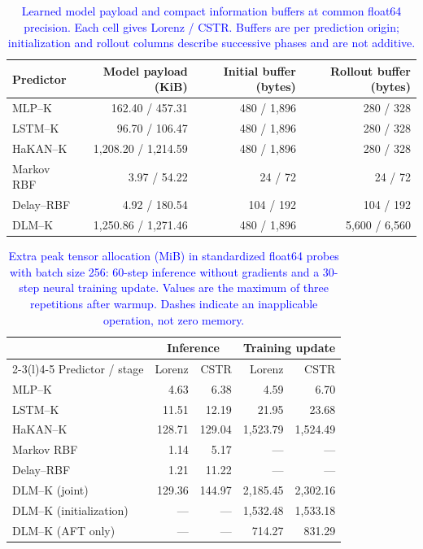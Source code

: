 \begin{table}[pos=!htbp]
\color{blue}
\hypersetup{linkcolor=blue,citecolor=blue}
\caption{\textcolor{blue}{Learned model payload and compact information buffers at common float64 precision. Each cell gives Lorenz / CSTR. Buffers are per prediction origin; initialization and rollout columns describe successive phases and are not additive.}}
\label{tab:storage-components}
\centering\small
\setlength{\tabcolsep}{5pt}
\begin{tabular}{@{}lrrr@{}}
\toprule
Predictor & Model payload (KiB) & Initial buffer (bytes) & Rollout buffer (bytes) \\
\midrule
MLP--K & 162.40 / 457.31 & 480 / 1,896 & 280 / 328 \\
LSTM--K & 96.70 / 106.47 & 480 / 1,896 & 280 / 328 \\
HaKAN--K & 1,208.20 / 1,214.59 & 480 / 1,896 & 280 / 328 \\
Markov RBF & 3.97 / 54.22 & 24 / 72 & 24 / 72 \\
Delay--RBF & 4.92 / 180.54 & 104 / 192 & 104 / 192 \\
DLM--K & 1,250.86 / 1,271.46 & 480 / 1,896 & 5,600 / 6,560 \\
\bottomrule
\end{tabular}
\end{table}

\begin{table}[pos=!htbp]
\color{blue}
\hypersetup{linkcolor=blue,citecolor=blue}
\caption{\textcolor{blue}{Extra peak tensor allocation (MiB) in standardized float64 probes with batch size 256: 60-step inference without gradients and a 30-step neural training update. Values are the maximum of three repetitions after warmup. Dashes indicate an inapplicable operation, not zero memory.}}
\label{tab:storage-profiles}
\centering\small
\setlength{\tabcolsep}{6pt}
\begin{tabular}{@{}lrrrr@{}}
\toprule
& \multicolumn{2}{c}{Inference} & \multicolumn{2}{c}{Training update} \\
\cmidrule(lr){2-3}\cmidrule(l){4-5}
Predictor / stage & Lorenz & CSTR & Lorenz & CSTR \\
\midrule
MLP--K & 4.63 & 6.38 & 4.59 & 6.70 \\
LSTM--K & 11.51 & 12.19 & 21.95 & 23.68 \\
HaKAN--K & 128.71 & 129.04 & 1,523.79 & 1,524.49 \\
Markov RBF & 1.14 & 5.17 & --- & --- \\
Delay--RBF & 1.21 & 11.22 & --- & --- \\
DLM--K (joint) & 129.36 & 144.97 & 2,185.45 & 2,302.16 \\
DLM--K (initialization) & --- & --- & 1,532.48 & 1,533.18 \\
DLM--K (AFT only) & --- & --- & 714.27 & 831.29 \\
\bottomrule
\end{tabular}
\end{table}
